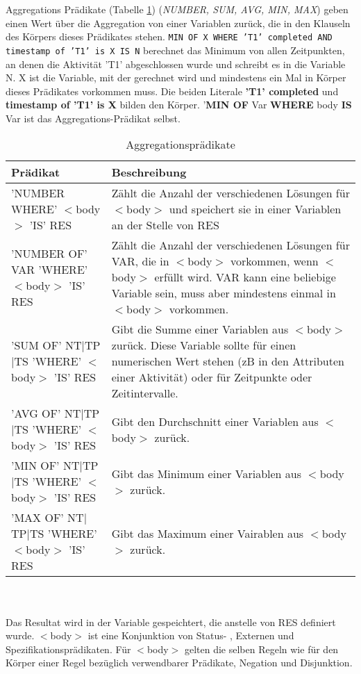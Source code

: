 Aggregations Prädikate (Tabelle \ref{tab:conditional}) (\textit{NUMBER, SUM, AVG, MIN, MAX}) geben einen Wert über die Aggregation von einer Variablen zurück, die in den Klauseln des Körpers dieses Prädikates stehen. \texttt{MIN OF X WHERE 'T1' completed AND timestamp of 'T1' is X IS N} berechnet das Minimum von allen Zeitpunkten, an denen die Aktivität 'T1' abgeschlossen wurde und schreibt es in die Variable N. X ist die Variable, mit der gerechnet wird und mindestens ein Mal in Körper dieses Prädikates vorkommen muss. Die beiden Literale \textbf{'T1' completed} und \textbf{timestamp of 'T1' is X} bilden den Körper. '\textbf{MIN OF} Var \textbf{WHERE} body \textbf{IS} Var ist das Aggregations-Prädikat selbst.
\begin{table}[h]
\begin{tabular} {|p{6cm}|p{10cm}|}
\hline
\textbf{Prädikat} & \textbf{Beschreibung}\\
\hline
'NUMBER WHERE' $<$body$>$ 'IS' RES		& Zählt die Anzahl der verschiedenen Lösungen für $<$body$>$ und speichert sie in einer Variablen an der Stelle von RES \\
\hline
'NUMBER OF' VAR 'WHERE' $<$body$>$ 'IS' RES	& Zählt die Anzahl der verschiedenen Lösungen für VAR, die in $<$body$>$ vorkommen, wenn $<$body$>$ erfüllt wird. VAR kann eine beliebige Variable sein, muss aber mindestens einmal in $<$body$>$ vorkommen.\\
\hline
'SUM OF' NT$|$TP$|$TS 'WHERE' $<$body$>$ 'IS' RES		& Gibt die Summe einer Variablen aus $<$body$>$ zurück. Diese Variable sollte für einen numerischen Wert stehen (zB in den Attributen einer Aktivität) oder für Zeitpunkte oder Zeitintervalle.\\
\hline
'AVG OF' NT$|$TP$|$TS 'WHERE' $<$body$>$ 'IS' RES		& Gibt den Durchschnitt einer Variablen aus $<$body$>$ zurück.\\
\hline
'MIN OF' NT$|$TP$|$TS 'WHERE' $<$body$>$ 'IS' RES		& Gibt das Minimum einer Variablen aus $<$body$>$ zurück.\\
\hline
'MAX OF' NT$|$TP$|$TS 'WHERE' $<$body$>$ 'IS' RES		& Gibt das Maximum einer Vairablen aus $<$body$>$ zurück.\\
\hline
\end{tabular}
\\\\\small Das Resultat wird in der Variable gespeichtert, die anstelle von RES definiert wurde. $<$body$>$ ist eine Konjunktion von Status- , Externen und Spezifikationsprädikaten. Für $<$body$>$ gelten die selben Regeln wie für den Körper einer Regel bezüglich verwendbarer Prädikate, Negation und Disjunktion. 
\caption{Aggregationsprädikate}
\label{tab:conditional}
\end{table}


